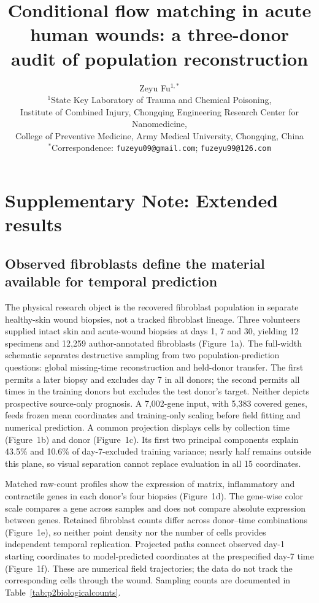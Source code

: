 \documentclass[10pt,a4paper]{article}
\title{Conditional flow matching in acute human wounds: a three-donor audit of population reconstruction}
\author{Zeyu Fu$^{1,*}$\\[3pt]\small $^1$State Key Laboratory of Trauma and Chemical Poisoning,\\\small Institute of Combined Injury, Chongqing Engineering Research Center for Nanomedicine,\\\small College of Preventive Medicine, Army Medical University, Chongqing, China\\\small $^*$Correspondence: \texttt{fuzeyu09@gmail.com}; \texttt{fuzeyu99@126.com}}\date{}
\begin{document}
\renewcommand{\thefigure}{S\arabic{figure}}
\maketitle
\modulolinenumbers[5]\linenumbers\supplement
\section*{Supplementary Note: Extended results}
\subsection{Observed fibroblasts define the material available for temporal prediction}

The physical research object is the recovered fibroblast population in separate healthy-skin wound biopsies, not a tracked fibroblast lineage. Three volunteers supplied intact skin and acute-wound biopsies at days 1, 7 and 30, yielding 12 specimens and 12,259 author-annotated fibroblasts (Figure~1a\label{call:p2f1}). The full-width schematic separates destructive sampling from two population-prediction questions: global missing-time reconstruction and held-donor transfer. The first permits a later biopsy and excludes day 7 in all donors; the second permits all times in the training donors but excludes the test donor's target. Neither depicts prospective source-only prognosis. A 7,002-gene input, with 5,383 covered genes, feeds frozen mean coordinates and training-only scaling before field fitting and numerical prediction. A common projection displays cells by collection time (Figure~1b) and donor (Figure~1c). Its first two principal components explain 43.5\% and 10.6\% of day-7-excluded training variance; nearly half remains outside this plane, so visual separation cannot replace evaluation in all 15 coordinates.



Matched raw-count profiles show the expression of matrix, inflammatory and contractile genes in each donor's four biopsies (Figure~1d). The gene-wise color scale compares a gene across samples and does not compare absolute expression between genes. Retained fibroblast counts differ across donor--time combinations (Figure~1e), so neither point density nor the number of cells provides independent temporal replication. Projected paths connect observed day-1 starting coordinates to model-predicted coordinates at the prespecified day-7 time (Figure~1f). These are numerical field trajectories; the data do not track the corresponding cells through the wound. Sampling counts are documented in Table~\ref{tab:p2biologicalcounts}.
\end{document}
